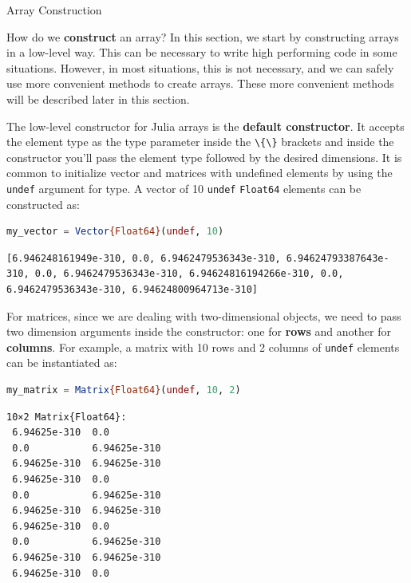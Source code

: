 \documentclass[
  notoc %
]{tufte-book}
\makeatletter
\newcommand{\passthrough}[1]{#1}
\renewcommand\subsubsection{%
\@startsection{subsubsection}{3}{\z@ }{-3.25ex\@plus -1ex \@minus -.2ex}{1.5ex \@plus .2ex}{\normalfont \normalsize \bfseries }
}
\makeatother
\begin{document}
\hypertarget{sec:array_construction}{%
\subsubsection{Array Construction}\label{sec:array_construction}}

How do we \textbf{construct} an array? In this section, we start by
constructing arrays in a low-level way. This can be necessary to write
high performing code in some situations. However, in most situations,
this is not necessary, and we can safely use more convenient methods to
create arrays. These more convenient methods will be described later in
this section.

The low-level constructor for Julia arrays is the \textbf{default
constructor}. It accepts the element type as the type parameter inside
the \passthrough{\lstinline!\{\}!} brackets and inside the constructor
you'll pass the element type followed by the desired dimensions. It is
common to initialize vector and matrices with undefined elements by
using the \passthrough{\lstinline!undef!} argument for type. A vector of
10 \passthrough{\lstinline!undef!} \passthrough{\lstinline!Float64!}
elements can be constructed as:

\begin{lstlisting}[language=Julia]
my_vector = Vector{Float64}(undef, 10)
\end{lstlisting}

\begin{lstlisting}[language=Output]
[6.946248161949e-310, 0.0, 6.9462479536343e-310, 6.94624793387643e-310, 0.0, 6.9462479536343e-310, 6.94624816194266e-310, 0.0, 6.9462479536343e-310, 6.94624800964713e-310]
\end{lstlisting}

For matrices, since we are dealing with two-dimensional objects, we need
to pass two dimension arguments inside the constructor: one for
\textbf{rows} and another for \textbf{columns}. For example, a matrix
with 10 rows and 2 columns of \passthrough{\lstinline!undef!} elements
can be instantiated as:

\begin{lstlisting}[language=Julia]
my_matrix = Matrix{Float64}(undef, 10, 2)
\end{lstlisting}

\begin{lstlisting}[language=Output]
10×2 Matrix{Float64}:
 6.94625e-310  0.0
 0.0           6.94625e-310
 6.94625e-310  6.94625e-310
 6.94625e-310  0.0
 0.0           6.94625e-310
 6.94625e-310  6.94625e-310
 6.94625e-310  0.0
 0.0           6.94625e-310
 6.94625e-310  6.94625e-310
 6.94625e-310  0.0
\end{lstlisting}
\end{document}
